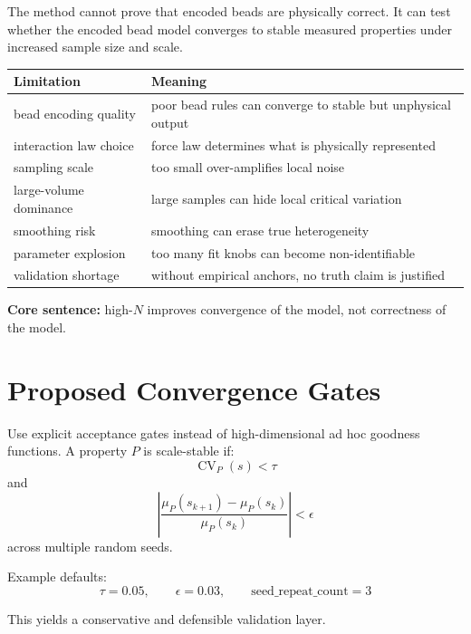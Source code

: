 \documentclass[11pt, a4paper, oneside]{article}
\DeclareMathOperator{\CV}{CV}
\begin{document}
The method cannot prove that encoded beads are physically correct. It can test whether the encoded bead model converges to stable measured properties under increased sample size and scale.

\begin{center}
\begin{tabularx}{\linewidth}{lX}
\toprule
Limitation & Meaning \\
\midrule
bead encoding quality & poor bead rules can converge to stable but unphysical output \\
interaction law choice & force law determines what is physically represented \\
sampling scale & too small over-amplifies local noise \\
large-volume dominance & large samples can hide local critical variation \\
smoothing risk & smoothing can erase true heterogeneity \\
parameter explosion & too many fit knobs can become non-identifiable \\
validation shortage & without empirical anchors, no truth claim is justified \\
\bottomrule
\end{tabularx}
\end{center}

\textbf{Core sentence:} high-$N$ improves convergence of the model, not correctness of the model.

\section{Proposed Convergence Gates}

Use explicit acceptance gates instead of high-dimensional ad hoc goodness functions.
A property $P$ is scale-stable if:
\begin{equation}
\CV_P(s) < \tau
\end{equation}
and
\begin{equation}
\left|\frac{\mu_P(s_{k+1})-\mu_P(s_k)}{\mu_P(s_k)}\right| < \epsilon
\end{equation}
across multiple random seeds.

Example defaults:
\begin{equation}
\tau = 0.05,\qquad \epsilon = 0.03,\qquad \text{seed\_repeat\_count}=3
\end{equation}

This yields a conservative and defensible validation layer.
\end{document}

